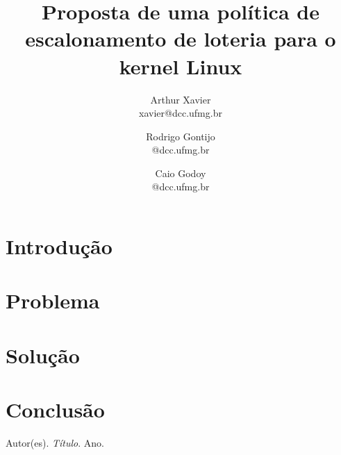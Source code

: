 \documentclass[a4paper,12pt]{article}
\title{Proposta de uma política de escalonamento de loteria para o kernel Linux}
\author{
    Arthur Xavier\\
    \small{xavier@dcc.ufmg.br}
    \and
    Rodrigo Gontijo\\
    \small{@dcc.ufmg.br}
    \and
    Caio Godoy\\
    \small{@dcc.ufmg.br}
}
\begin{document}
\maketitle

\begin{abstract}
\end{abstract}

\section{Introdução}

\section{Problema}

\section{Solução}

\section{Conclusão}

\begin{thebibliography}{99}
 Autor(es). \emph{Título}. Ano.
\end{thebibliography}
\end{document}

